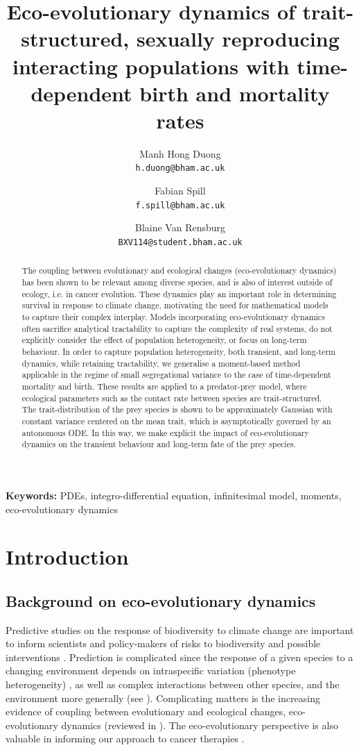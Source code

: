 \documentclass[]{article}
\title{Eco-evolutionary dynamics of trait-structured, sexually
reproducing interacting populations with time-dependent birth and mortality rates}
\author{}
\author{
  Manh Hong Duong\\
  \texttt{h.duong@bham.ac.uk}
  \and
  Fabian Spill\\
  \texttt{f.spill@bham.ac.uk}
    \and
 Blaine Van Rensburg\\
\texttt{BXV114@student.bham.ac.uk}
}
\theoremstyle{remark}
\begin{document}
\maketitle

\begin{abstract}
The coupling between evolutionary and ecological changes (eco-evolutionary dynamics) has been shown to be relevant among diverse species, and is also of interest outside of ecology, i.e. in cancer evolution. These dynamics play an important role in determining survival in response to climate change, motivating the need for mathematical models to capture their complex interplay. Models incorporating eco-evolutionary dynamics often sacrifice analytical tractability to capture the complexity of real systems, do not explicitly consider the effect of population heterogeneity, or focus on long-term behaviour. In order to capture population heterogeneity, both transient, and long-term dynamics, while retaining tractability, we generalise a moment-based method applicable in the regime of small segregational variance to the case of time-dependent mortality and birth. These results are applied to a predator-prey model, where ecological parameters such as the contact rate between species are trait-structured. The trait-distribution of the prey species is shown to be approximately Gaussian with constant variance centered on the mean trait, which is asymptotically governed by an autonomous ODE. In this way, we make explicit the impact of eco-evolutionary dynamics on the transient behaviour and long-term fate of the prey species. 

\end{abstract}

\textbf{Keywords:} PDEs, integro-differential equation, infinitesimal model, moments, eco-evolutionary dynamics





\section{Introduction}
\subsection{Background on eco-evolutionary dynamics}
Predictive studies on the response of biodiversity to climate change are important to inform scientists and policy-makers of risks to biodiversity and possible interventions \cite{bellard2012impacts}. Prediction is complicated since the response of a given species to a changing environment depends on intraspecific variation (phenotype heterogeneity) \cite{moran2016intraspecific,mimura2017understanding,bolnick2011intraspecific}, as well as complex interactions between other species, and the environment more generally (see \cite{hendry2011evolutionary}). Complicating matters is the increasing evidence of coupling between evolutionary and ecological changes, eco-evolutionary dynamics (reviewed in \cite{fussmann2007eco,pelletier2009eco, govaert2019eco,post2009eco,hairston2005rapid}). The eco-evolutionary perspective is also valuable in informing our approach to cancer therapies \cite{adler2019cancer}. 
\end{document}
